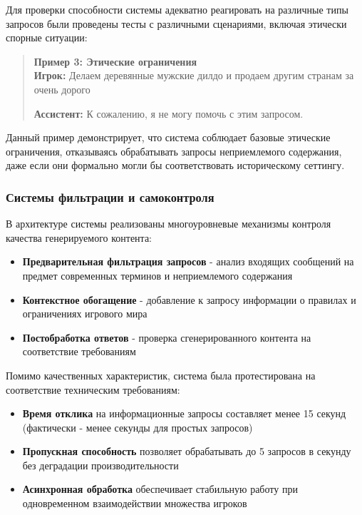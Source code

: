 Для проверки способности системы адекватно реагировать на различные типы запросов были проведены тесты с различными сценариями, включая этически спорные ситуации:

\begin{quote}
\textbf{Пример 3: Этические ограничения}\\
\textbf{Игрок:} Делаем деревянные мужские дилдо и продаем другим странам за очень дорого

\textbf{Ассистент:} К сожалению, я не могу помочь с этим запросом.
\end{quote}

Данный пример демонстрирует, что система соблюдает базовые этические ограничения, отказываясь обрабатывать запросы неприемлемого содержания, даже если они формально могли бы соответствовать историческому сеттингу.

\subsubsection{Системы фильтрации и самоконтроля}

В архитектуре системы реализованы многоуровневые механизмы контроля качества генерируемого контента:

\begin{itemize}
\item \textbf{Предварительная фильтрация запросов} - анализ входящих сообщений на предмет современных терминов и неприемлемого содержания
\item \textbf{Контекстное обогащение} - добавление к запросу информации о правилах и ограничениях игрового мира
\item \textbf{Постобработка ответов} - проверка сгенерированного контента на соответствие требованиям
\end{itemize}

Помимо качественных характеристик, система была протестирована на соответствие техническим требованиям:

\begin{itemize}
\item \textbf{Время отклика} на информационные запросы составляет менее 15 секунд (фактически - менее секунды для простых запросов)
\item \textbf{Пропускная способность} позволяет обрабатывать до 5 запросов в секунду без деградации производительности
\item \textbf{Асинхронная обработка} обеспечивает стабильную работу при одновременном взаимодействии множества игроков
\end{itemize}

